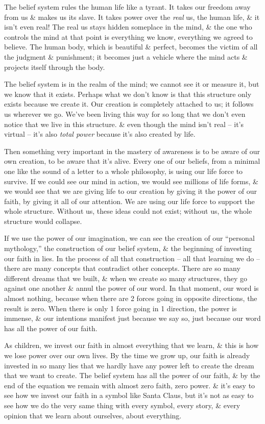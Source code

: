 \documentclass{article}
\numberwithin{equation}{section}
\begin{document}
The belief system rules the human life like a tyrant. It takes our freedom away from us \& makes us its slave. It takes power over the \textit{real} us, the human life, \& it isn't even real! The real us stays hidden someplace in the mind, \& the one who controls the mind at that point is everything we know, everything we agreed to believe. The human body, which is beautiful \& perfect, becomes the victim of all the judgment \& punishment; it becomes just a vehicle where the mind acts \& projects itself through the body.

The belief system is in the realm of the mind; we cannot see it or measure it, but we know that it exists. Perhaps what we don't know is that this structure only exists because we create it. Our creation is completely attached to us; it follows us wherever we go. We've been living this way for so long that we don't even notice that we live in this structure. \& even though the mind isn't real -- it's virtual -- it's also \textit{total power} because it's also created by life.

Then something very important in the mastery of awareness is to be aware of our own creation, to be aware that it's alive. Every one of our beliefs, from a minimal one like the sound of a letter to a whole philosophy, is using our life force to survive. If we could see our mind in action, we would see millions of life forms, \& we would see that we are giving life to our creation by giving it the power of our faith, by giving it all of our attention. We are using our life force to support the whole structure. Without us, these ideas could not exist; without us, the whole structure would collapse.

If we use the power of our imagination, we can see the creation of our ``personal mythology,'' the construction of our belief system, \& the beginning of investing our faith in lies. In the process of all that construction -- all that learning we do -- there are many concepts that contradict other concepts. There are so many different dreams that we built, \& when we create so many structures, they go against one another \& annul the power of our word. In that moment, our word is almost nothing, because when there are 2 forces going in opposite directions, the result is zero. When there is only 1 force going in 1 direction, the power is immense, \& our intentions manifest just because we say so, just because our word has all the power of our faith.

As children, we invest our faith in almost everything that we learn, \& this is how we lose power over our own lives. By the time we grow up, our faith is already invested in so many lies that we hardly have any power left to create the dream that we want to create. The belief system has all the power of our faith, \& by the end of the equation we remain with almost zero faith, zero power. \& it's easy to see how we invest our faith in a symbol like Santa Claus, but it's not as easy to see how we do the very same thing with every symbol, every story, \& every opinion that we learn about ourselves, about everything.
\end{document}
